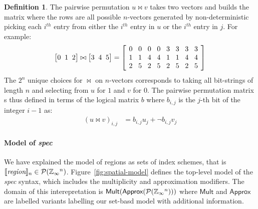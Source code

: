 \documentclass[9pt]{sigplanconf}
\newcounter{block}
\theoremstyle{definition}
\newtheorem{definition}[block]{Definition}
\newcommand{\interp}[1]{\llbracket{#1}\rrbracket}
\newcommand{\vthreeh}[3]{\setlength{\arraycolsep}{0em}
\left[\begin{array}{ccc}#1 \; & \; #2 \; & \; #3\end{array}\right]}
\begin{document}
\begin{definition}
The pairwise permutation $u \bowtie v$ takes two vectors and builds the matrix
where the rows are all possible $n$-vectors generated by
non-deterministic picking each $i^{th}$ entry from either the
$i^{th}$ entry in $u$ or the $i^{th}$ entry in $j$. For example:
%
\begin{equation*}
\vthreeh{0}{1}{2} \bowtie \vthreeh{3}{4}{5} =
\left[
\setlength{\arraycolsep}{0.42em}
\begin{array}{cccccccc}
0 & 0 & 0 & 0 & 3 & 3 & 3 & 3 \\ 
1 & 1 & 4 & 4 & 1 & 1 & 4 & 4 \\
2 & 5 & 2 & 5 & 2 & 5 & 2 & 5
\end{array}
\right]
\end{equation*}
%
The $2^n$ unique choices for $\bowtie$ on $n$-vectors
corresponds to taking all bit-strings of length $n$ and
selecting from $u$ for $1$ and $v$ for $0$. The pairwise permutation
matrix  s thus defined in terms of the logical
matrix $b$ where $b_{i,j}$ is the $j$-th bit of the integer
$i - 1$ as:
%
\begin{align*}
(u \bowtie v)_{i,j} & = b_{i,j} u_j + \neg b_{i,j} v_j
\end{align*}
%
\end{definition}



\paragraph{Model of \textit{spec}}

We have explained the model of regions as sets of index
schemes, that is
$\interp{\textit{region}}_n \in \mathcal{P}(\domainVal{}^n)$.
Figure~\ref{fig:spatial-model} defines the top-level model of the
\textit{spec} syntax, which includes the multiplicity and
approximation modifiers. The domain of this interepretation
is $\textsf{Mult}(\textsf{Approx}(\mathcal{P}(\mathbb{Z}_\infty{}^n)))$
where $\textsf{Mult}$ and $\textsf{Approx}$ are labelled variants
labelling our set-basd model with additional information.
\end{document}
